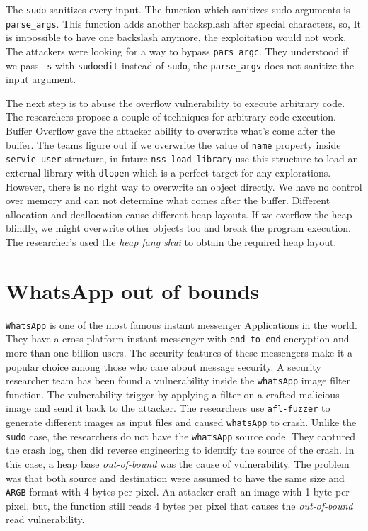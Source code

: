 \documentclass{masterthesis}
\begin{document}
The \lstinline{sudo} sanitizes every input. The function which sanitizes sudo arguments is \lstinline{parse_args}. This function adds another backsplash after special characters, so, It is impossible to have one backslash anymore, the exploitation would not work. The attackers were looking for a way to bypass \lstinline{pars_argc}. They understood if we pass \lstinline{-s} with \lstinline{sudoedit} instead of \lstinline{sudo}, the \lstinline{parse_argv} does not sanitize the input argument.

The next step is to abuse the overflow vulnerability to execute arbitrary code. The researchers propose a couple of techniques for arbitrary code execution. Buffer Overflow gave the attacker ability to overwrite what's come after the buffer. The teams figure out if we overwrite the value of \lstinline{name} property inside \lstinline{servie_user} structure, in future \lstinline{nss_load_library} use this structure to load an external library with \lstinline{dlopen} which is a perfect target for any explorations. However, there is no right way to overwrite an object directly. We have no control over memory and can not determine what comes after the buffer. Different allocation and deallocation cause different heap layouts. If we overflow the heap blindly, we might overwrite other objects too and break the program execution. The researcher's used the \emph{heap fang shui} to obtain the required heap layout.

\section{WhatsApp out of bounds}
\label{sect:whatsappexp}
\lstinline{WhatsApp} is one of the most famous instant messenger Applications in the world. They have a cross platform instant messenger with \lstinline{end-to-end} encryption and more than one billion users. The security features of these messengers make it a popular choice among those who care about message security.
A security researcher team has been found a vulnerability inside the \lstinline{whatsApp} image filter function. The vulnerability trigger by applying a filter on a crafted malicious image and send it back to the attacker. The researchers use \lstinline{afl-fuzzer} to generate different images as input files and caused \lstinline{whatsApp} to crash. Unlike the \lstinline{sudo} case, the researchers do not have the \lstinline{whatsApp} source code. They captured the crash log, then did reverse engineering to identify the source of the crash. In this case, a heap base \emph{out-of-bound} was the cause of vulnerability. The problem was that both source and destination were assumed to have the same size and \lstinline{ARGB} format with 4 bytes per pixel. An attacker craft an image with 1 byte per pixel, but, the function still reads 4 bytes per pixel that causes the \emph{out-of-bound} read vulnerability.
\end{document}
